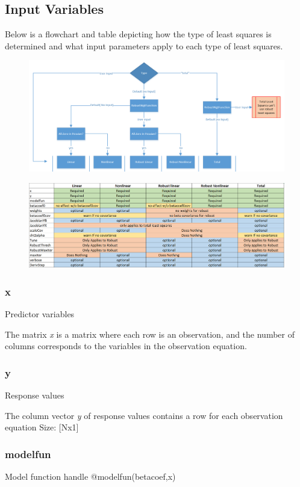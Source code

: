 \documentclass{article}
\begin{document}
	\subsection{Input Variables}
	Below is a flowchart and table depicting how the type of least squares is determined and what input parameters apply to each type of least squares.
	
	\begin{figure}[H]
		\centering
		\includegraphics[width = \linewidth]{typeflow}
	\end{figure}
	\begin{figure}[H]
		\centering
		\includegraphics[width = \linewidth]{warningerrors}
	\end{figure}
	
	\subsubsection{x}
	Predictor variables
	
	The matrix \textit{x} is a matrix where each row is an observation, and the number of columns corresponds to the variables in the observation equation.
	\subsubsection{y}
	Response values
	
	The column vector \textit{y} of response values contains a row for each observation equation Size: [Nx1]
	\subsubsection{modelfun}
	Model function handle @modelfun(betacoef,x)
	
\end{document}
